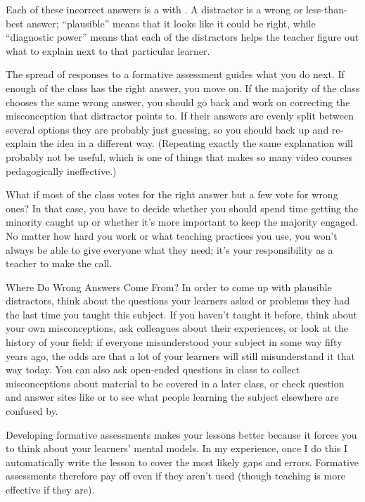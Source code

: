 Each of these incorrect answers is a 
with .
A distractor is a wrong or less-than-best answer;
``plausible'' means that it looks like it could be right,
while ``diagnostic power'' means that each of the distractors helps the teacher figure out
what to explain next to that particular learner.

The spread of responses to a formative assessment guides what you do next.
If enough of the class has the right answer, you move on.
If the majority of the class chooses the same wrong answer,
you should go back and work on correcting the misconception that distractor points to.
If their answers are evenly split between several options they are probably just guessing,
so you should back up and re-explain the idea in a different way.
(Repeating exactly the same explanation will probably not be useful,
which is one of things that makes so many video courses pedagogically ineffective.)

What if most of the class votes for the right answer
but a few vote for wrong ones?
In that case,
you have to decide whether you should spend time getting the minority caught up
or whether it's more important to keep the majority engaged.
No matter how hard you work or what teaching practices you use,
you won't always be able to give everyone what they need;
it's your responsibility as a teacher to make the call.

\begin{aside}{Where Do Wrong Answers Come From?}
  In order to come up with plausible distractors,
  think about the questions your learners asked or problems they had
  the last time you taught this subject.
  If you haven't taught it before,
  think about your own misconceptions,
  ask colleagues about their experiences,
  or look at the history of your field:
  if everyone misunderstood your subject in some way fifty years ago,
  the odds are that a lot of your learners will still misunderstand it that way today.
  You can also ask open-ended questions in class
  to collect misconceptions about material to be covered in a later class,
  or check question and answer sites like  or 
  to see what people learning the subject elsewhere are confused by.
\end{aside}

Developing formative assessments makes your lessons better
because it forces you to think about your learners' mental models.
In my experience,
once I do this I automatically write the lesson to cover the most likely gaps and errors.
Formative assessments therefore pay off even if they aren't used
(though teaching is more effective if they are).

